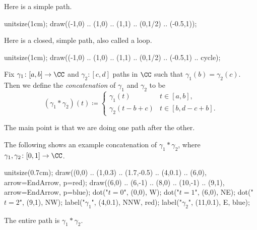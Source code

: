 \documentclass[../notes.tex]{subfiles}
\begin{document}
\begin{example}
	Here is a simple path.
	\begin{center}
		\begin{asy}
			unitsize(1cm);
			draw((-1,0) .. (1,0) .. (1,1) .. (0,1/2) .. (-0.5,1));
		\end{asy}
	\end{center}
\end{example}
\begin{example}
	Here is a closed, simple path, also called a loop.
	\begin{center}
		\begin{asy}
			unitsize(1cm);
			draw((-1,0) .. (1,0) .. (1,1) .. (0,1/2) .. (-0.5,1) .. cycle);
		\end{asy}
	\end{center}
\end{example}
\begin{definition}[Concatenation]
	Fix $\gamma_1\colon[a,b]\to\CC$ and $\gamma_2\colon[c,d]$ paths in $\CC$ such that $\gamma_1(b)=\gamma_2(c)$. Then we define the \textit{concatenation} of $\gamma_1$ and $\gamma_2$ to be
	\[(\gamma_1*\gamma_2)(t)\coloneqq \begin{cases}
		\gamma_1(t) & t\in[a,b], \\
		\gamma_2(t-b+c) & t\in[b,d-c+b].
	\end{cases}\]
\end{definition}
The main point is that we are doing one path after the other.
\begin{example}
	The following shows an example concatenation of $\gamma_1*\gamma_2$, where $\gamma_1,\gamma_2\colon[0,1]\to\CC$.
	\begin{center}
		\begin{asy}
			unitsize(0.7cm);
			draw((0,0) .. (1,0.3) .. (1.7,-0.5) .. (4,0.1) .. (6,0), arrow=EndArrow, p=red);
			draw((6,0) .. (6,-1) .. (8,0) .. (10,-1) .. (9,1), arrow=EndArrow, p=blue);
			dot("$t=0$", (0,0), W);
			dot("$t=1$", (6,0), NE);
			dot("$t=2$", (9,1), NW);
			label("$\gamma_1$", (4,0.1), NNW, red);
			label("$\gamma_2$", (11,0.1), E, blue);
		\end{asy}
	\end{center}
	The entire path is $\gamma_1*\gamma_2$.
\end{example}
\end{document}

